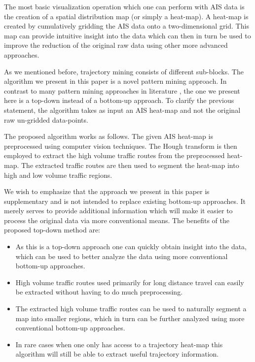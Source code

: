 \documentclass{article}
\begin{document}
The most basic visualization operation which one can perform with AIS data is the creation of a spatial distribution map (or simply a heat-map). A heat-map 
is created by cumulatively gridding the AIS data onto a two-dimensional grid. This map can provide 
intuitive insight into the data which can then in turn be used to improve the reduction of the original raw data using other more advanced approaches.

As we mentioned before, trajectory mining consists of different sub-blocks. The algorithm we present in this paper is a novel pattern mining approach. In contrast to many 
pattern mining approaches in literature \cite{zheng2015}, the one we present here is a top-down instead of a bottom-up approach. To clarify the previous statement, the algorithm 
takes as input an AIS heat-map and not the original raw un-gridded data-points.

The proposed algorithm works as follows. The given AIS heat-map is preprocessed using computer vision techniques. The Hough transform is then employed to extract the high volume traffic routes from the preprocessed heat-map. The extracted traffic routes are then used to segment the 
heat-map into high and low volume traffic regions.

We wish to emphasize that the approach we present in this paper is supplementary and is not intended to replace existing bottom-up approaches. It merely serves to provide additional information 
which will make it easier to process the original data via more conventional means.
The benefits of the proposed top-down method are:
\begin{itemize}
 \item As this is a top-down approach one can quickly obtain insight into the data, which can be used to better analyze the data using more conventional bottom-up approaches.
 \item High volume traffic routes used primarily for long distance travel can easily be extracted without having to do much preprocessing. 
 \item The extracted high volume traffic routes can be used to naturally segment a map into smaller regions, which in turn can be further analyzed using more conventional bottom-up approaches.
 \item In rare cases when one only has access to a trajectory heat-map this algorithm will still be able to extract useful trajectory information.
 \end{itemize}
 
\end{document}
